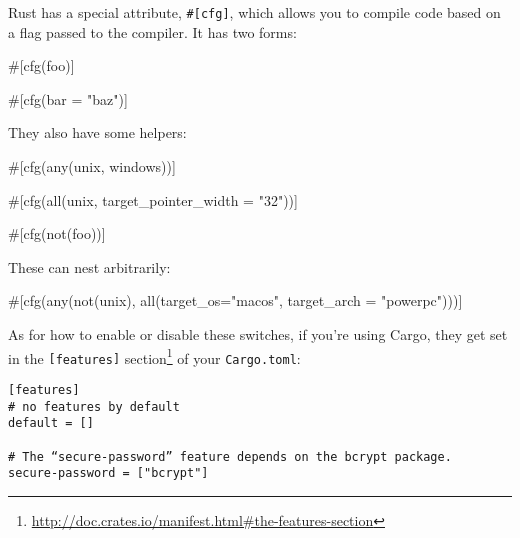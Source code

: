 \documentclass[a4paper,]{book}
\newenvironment{Shaded}{\begin{snugshade}}{\end{snugshade}}
\newcommand{\StringTok}[1]{\textcolor[rgb]{0.31,0.60,0.02}{{#1}}}
\newcommand{\OtherTok}[1]{\textcolor[rgb]{0.56,0.35,0.01}{{#1}}}
\newcommand{\NormalTok}[1]{{#1}}
\renewcommand{\href}[2]{#2\footnote{\url{#1}}}
\begin{document}
Rust has a special attribute, \texttt{\#{[}cfg{]}}, which allows you to
compile code based on a flag passed to the compiler. It has two forms:

\begin{Shaded}
\begin{Highlighting}[]
\OtherTok{#[}\NormalTok{cfg}\OtherTok{(}\NormalTok{foo}\OtherTok{)]}

\OtherTok{#[}\NormalTok{cfg}\OtherTok{(}\NormalTok{bar }\OtherTok{=} \StringTok{"baz"}\OtherTok{)]}
\end{Highlighting}
\end{Shaded}

They also have some helpers:

\begin{Shaded}
\begin{Highlighting}[]
\OtherTok{#[}\NormalTok{cfg}\OtherTok{(}\NormalTok{any}\OtherTok{(}\NormalTok{unix}\OtherTok{,} \NormalTok{windows}\OtherTok{))]}

\OtherTok{#[}\NormalTok{cfg}\OtherTok{(}\NormalTok{all}\OtherTok{(}\NormalTok{unix}\OtherTok{,} \NormalTok{target_pointer_width }\OtherTok{=} \StringTok{"32"}\OtherTok{))]}

\OtherTok{#[}\NormalTok{cfg}\OtherTok{(}\NormalTok{not}\OtherTok{(}\NormalTok{foo}\OtherTok{))]}
\end{Highlighting}
\end{Shaded}

These can nest arbitrarily:

\begin{Shaded}
\begin{Highlighting}[]
\OtherTok{#[}\NormalTok{cfg}\OtherTok{(}\NormalTok{any}\OtherTok{(}\NormalTok{not}\OtherTok{(}\NormalTok{unix}\OtherTok{),} \NormalTok{all}\OtherTok{(}\NormalTok{target_os}\OtherTok{=}\StringTok{"macos"}\OtherTok{,} \NormalTok{target_arch }\OtherTok{=} \StringTok{"powerpc"}\OtherTok{)))]}
\end{Highlighting}
\end{Shaded}

As for how to enable or disable these switches, if you're using Cargo,
they get set in the
\href{http://doc.crates.io/manifest.html\#the-features-section}{\texttt{{[}features{]}}
section} of your \texttt{Cargo.toml}:

\begin{verbatim}
[features]
# no features by default
default = []

# The “secure-password” feature depends on the bcrypt package.
secure-password = ["bcrypt"]
\end{verbatim}
\end{document}
